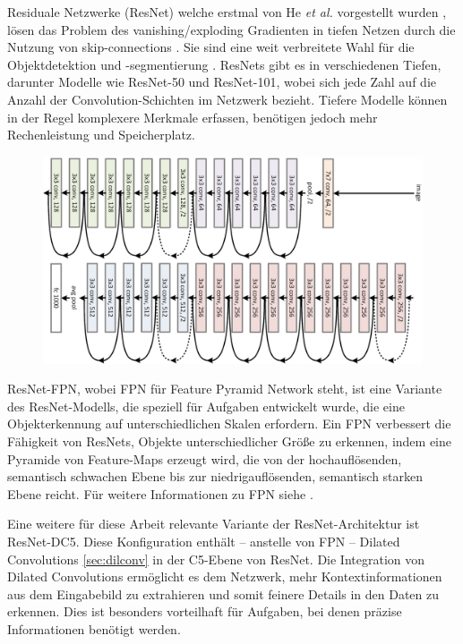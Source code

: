 Residuale Netzwerke (ResNet) welche erstmal von He \textit{et al.} vorgestellt wurden \cite{He_2016_CVPR}, lösen das Problem des vanishing/exploding Gradienten \cite{7112511} in tiefen Netzen durch die Nutzung von skip-connections \cite{1603.05027}\cite{1701.09175}\cite{1507.06228}. Sie sind eine weit verbreitete Wahl für die Objektdetektion und -segmentierung \cite{2206.08016}.
ResNets gibt es in verschiedenen Tiefen, darunter Modelle wie ResNet-50 und ResNet-101, wobei sich jede Zahl auf die Anzahl der Convolution-Schichten im Netzwerk bezieht. Tiefere Modelle können in der Regel komplexere Merkmale erfassen, benötigen jedoch mehr Rechenleistung und Speicherplatz.

\begin{figure}[htbp]
    \centering
    \includegraphics[width=\linewidth, angle=180]{img/resnet34.png}
    \label{fig:resnet34}
\end{figure}
ResNet-FPN, wobei FPN für Feature Pyramid Network steht, ist eine Variante des ResNet-Modells, die speziell für Aufgaben entwickelt wurde, die eine Objekterkennung auf unterschiedlichen Skalen erfordern. Ein FPN verbessert die Fähigkeit von ResNets, Objekte unterschiedlicher Größe zu erkennen, indem eine Pyramide von Feature-Maps erzeugt wird, die von der hochauflösenden, semantisch schwachen Ebene bis zur niedrigauflösenden, semantisch starken Ebene reicht. Für weitere Informationen zu FPN siehe \cite{1612.03144}.

Eine weitere für diese Arbeit relevante Variante der ResNet-Architektur ist ResNet-DC5. Diese Konfiguration enthält – anstelle von FPN – Dilated Convolutions \ref{sec:dilconv} in der C5-Ebene von ResNet. Die Integration von Dilated Convolutions ermöglicht es dem Netzwerk, mehr Kontextinformationen aus dem Eingabebild zu extrahieren und somit feinere Details in den Daten zu erkennen. Dies ist besonders vorteilhaft für Aufgaben, bei denen präzise Informationen benötigt werden.
